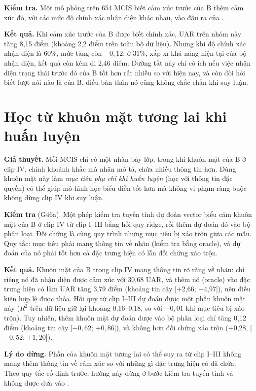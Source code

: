 \textbf{Kiểm tra.} Một mô phỏng trên 654 MCIS biết cảm xúc trước của B thêm cảm xúc đó, với các mức độ chính xác nhận diện khác nhau, vào đầu ra của \model{}.

\textbf{Kết quả.} Khi cảm xúc trước của B được biết chính xác, UAR trên nhóm này tăng 8,15 điểm (khoảng 2,2 điểm trên toàn bộ dữ liệu). Nhưng khi độ chính xác nhận diện là 60\%, mức tăng còn $-0{,}12$; ở 31\%, xấp xỉ khả năng hiện tại của bộ nhận diện, kết quả còn kém đi 2,46 điểm. Đường tắt này chỉ có ích nếu việc nhận diện trạng thái trước đó của B tốt hơn rất nhiều so với hiện nay, và còn đòi hỏi biết lượt nói nào là của B, điều bản thân nó cũng không chắc chắn khi suy luận.

\section{Học từ khuôn mặt tương lai khi huấn luyện}

\textbf{Giả thuyết.} Mỗi MCIS chỉ có một nhãn bảy lớp, trong khi khuôn mặt của B ở clip IV, chính khoảnh khắc mà nhãn mô tả, chứa nhiều thông tin hơn. Dùng khuôn mặt này làm \emph{mục tiêu phụ chỉ khi huấn luyện} (học với thông tin đặc quyền) có thể giúp mô hình học biểu diễn tốt hơn mà không vi phạm ràng buộc không dùng clip IV khi suy luận.

\textbf{Kiểm tra} (G46a). Một phép kiểm tra tuyến tính dự đoán vector biểu cảm khuôn mặt của B ở clip IV từ clip I--III bằng hồi quy ridge, rồi thêm dự đoán đó vào bộ phân loại. Đối chứng là cùng quy trình nhưng mục tiêu bị xáo trộn giữa các mẫu. Quy tắc: mục tiêu phải mang thông tin về nhãn (kiểm tra bằng oracle), và dự đoán của nó phải tốt hơn cả đặc trưng hiện có lẫn đối chứng xáo trộn.

\textbf{Kết quả.} Khuôn mặt của B trong clip IV mang thông tin rõ ràng về nhãn: chỉ riêng nó đã nhận diện được cảm xúc với 30,68 UAR, và thêm nó (oracle) vào đặc trưng hiện có làm UAR tăng 3,79 điểm (khoảng tin cậy [+2,66; +4,97]), nên điều kiện hợp lệ được thỏa. Hồi quy từ clip I--III dự đoán được một phần khuôn mặt này ($R^2$ trên dữ liệu giữ lại khoảng 0,16--0,18, so với $-0{,}01$ khi mục tiêu bị xáo trộn). Tuy nhiên, thêm khuôn mặt dự đoán được vào bộ phân loại chỉ tăng 0,12 điểm (khoảng tin cậy [$-0{,}62$; $+0{,}86$]), và không hơn đối chứng xáo trộn (+0,28, [$-0{,}52$; $+1{,}20$]).

\textbf{Lý do dừng.} Phần của khuôn mặt tương lai có thể suy ra từ clip I--III không mang thêm thông tin về cảm xúc so với những gì đặc trưng hiện có đã chứa. Theo quy tắc cố định trước, hướng này dừng ở bước kiểm tra tuyến tính và không được đưa vào \model{}.

